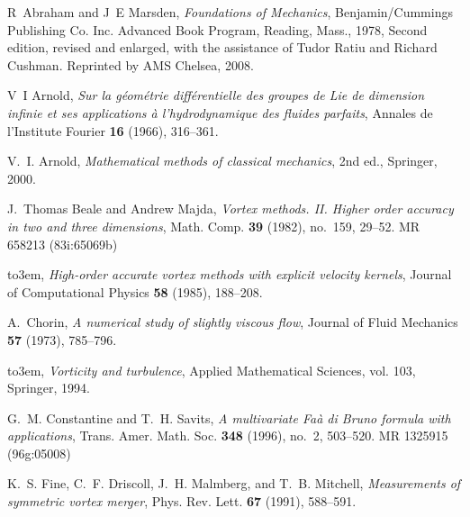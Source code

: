 \documentclass[12pt]{amsart}
\theoremstyle{remark}
\begin{document}
\providecommand{\bysame}{\leavevmode\hbox to3em{\hrulefill}\thinspace}
\providecommand{\MR}{\relax\ifhmode\unskip\space\fi MR }
\providecommand{\MRhref}[2]{%
  \href{http://www.ams.org/mathscinet-getitem?mr=#1}{#2}
}
\providecommand{\href}[2]{#2}
\begin{thebibliography}{FDMM91}

R~Abraham and J~E Marsden, \emph{Foundations of {M}echanics}, Benjamin/Cummings
  Publishing Co. Inc. Advanced Book Program, Reading, Mass., 1978, Second
  edition, revised and enlarged, with the assistance of Tudor Ratiu and Richard
  Cushman. Reprinted by AMS Chelsea, 2008.

V~I Arnold, \emph{Sur la g\'{e}om\'{e}trie diff\'{e}rentielle des groupes de
  {L}ie de dimension infinie et ses applications \`{a} l'hydrodynamique des
  fluides parfaits}, Annales de l'Institute Fourier \textbf{16} (1966),
  316--361.

V.~I. Arnold, \emph{Mathematical methods of classical mechanics}, 2nd ed.,
  Springer, 2000.

J.~Thomas Beale and Andrew Majda, \emph{Vortex methods. {II}. {H}igher order
  accuracy in two and three dimensions}, Math. Comp. \textbf{39} (1982),
  no.~159, 29--52. \MR{658213 (83i:65069b)}

\bysame, \emph{High-order accurate vortex methods with explicit velocity
  kernels}, Journal of Computational Physics \textbf{58} (1985), 188--208.

A.~Chorin, \emph{A numerical study of slightly viscous flow}, Journal of Fluid
  Mechanics \textbf{57} (1973), 785--796.

\bysame, \emph{Vorticity and turbulence}, Applied Mathematical Sciences, vol.
  103, Springer, 1994.

G.~M. Constantine and T.~H. Savits, \emph{A multivariate {F}a\`a di {B}runo
  formula with applications}, Trans. Amer. Math. Soc. \textbf{348} (1996),
  no.~2, 503--520. \MR{1325915 (96g:05008)}

K.~S. Fine, C.~F. Driscoll, J.~H. Malmberg, and T.~B. Mitchell,
  \emph{Measurements of symmetric vortex merger}, Phys. Rev. Lett. \textbf{67}
  (1991), 588--591.


\end{thebibliography}
\end{document}
